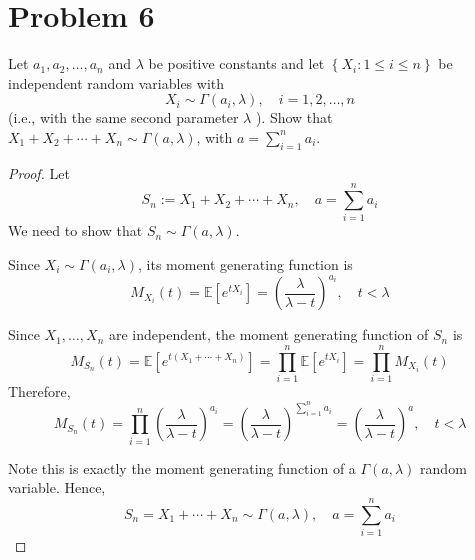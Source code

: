 \section*{Problem 6}
Let $a_1, a_2, \ldots, a_n$ and $\lambda$ be positive constants and 
let $\left\{X_i: 1 \leq i \leq n\right\}$ be independent random variables with
$$
X_i \sim \Gamma\left(a_i, \lambda\right), \quad i=1,2, \ldots, n
$$
(i.e., with the same second parameter $\lambda$ ). 
Show that $X_1+X_2+\cdots+X_n \sim \Gamma(a, \lambda)$, 
with $a=\sum_{i=1}^n a_i$.
\begin{proof}

Let
\[
S_n:=X_1+X_2+\cdots+X_n,
\quad a=\sum_{i=1}^n a_i
\]
We need to show that $
S_n \sim \Gamma(a,\lambda)
$.

Since \(X_i \sim \Gamma(a_i,\lambda)\), its moment generating function is
\[
M_{X_i}(t)=\mathbb{E}[e^{tX_i}]
=\left(\frac{\lambda}{\lambda-t}\right)^{a_i},
\quad t<\lambda
\]

Since \(X_1,\dots,X_n\) are independent, 
the moment generating function of \(S_n\) is
\[
M_{S_n}(t)
=\mathbb{E}[e^{t(X_1+\cdots+X_n)}]
=\prod_{i=1}^n \mathbb{E}[e^{tX_i}]
=\prod_{i=1}^n M_{X_i}(t)
\]
Therefore,
\[
M_{S_n}(t)
=\prod_{i=1}^n \left(\frac{\lambda}{\lambda-t}\right)^{a_i}
=\left(\frac{\lambda}{\lambda-t}\right)^{\sum_{i=1}^n a_i}
=\left(\frac{\lambda}{\lambda-t}\right)^a,
\quad t<\lambda
\]

Note this is exactly the moment generating function of a
 \(\Gamma(a,\lambda)\) random variable. Hence,
\[
S_n = 
X_1+\cdots+X_n \sim \Gamma(a,\lambda),
\quad a=\sum_{i=1}^n a_i
\]
\end{proof}